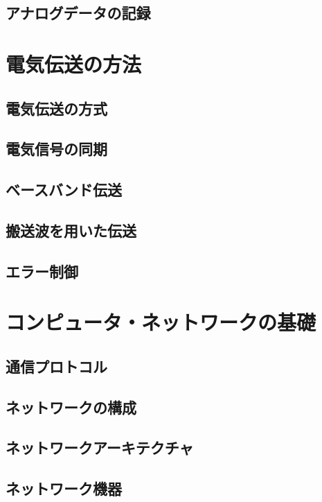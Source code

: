 \documentclass[a4j,12pt]{jreport}
\begin{document}
\chapter{アナログデータの記録}


\part{電気伝送の方法}

\chapter{電気伝送の方式}


\chapter{電気信号の同期}

\chapter{ベースバンド伝送}

\chapter{搬送波を用いた伝送}

\chapter{エラー制御}

\part{コンピュータ・ネットワークの基礎}

\chapter{通信プロトコル}

\chapter{ネットワークの構成}

\chapter{ネットワークアーキテクチャ}

\chapter{ネットワーク機器}
\end{document}
